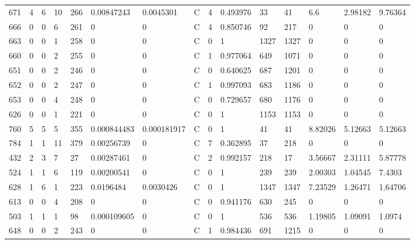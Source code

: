 \begin{latin}
\begin{longtable}{lllllllllllllll}
	671 & 4  & 6   & 10 & 266 & 0.00847243     & 0.0045301      & C & 4  & 0.493976 & 33   & 41   & 6.6     & 2.98182 & 9.76364 \\
	666 & 0  & 0   & 6  & 261 & 0              & 0              & C & 4  & 0.850746 & 92   & 217  & 0       & 0       & 0       \\
	663 & 0  & 0   & 1  & 258 & 0              & 0              & C & 0  & 1        & 1327 & 1327 & 0       & 0       & 0       \\
	660 & 0  & 0   & 2  & 255 & 0              & 0              & C & 1  & 0.977064 & 649  & 1071 & 0       & 0       & 0       \\
	651 & 0  & 0   & 2  & 246 & 0              & 0              & C & 0  & 0.640625 & 687  & 1201 & 0       & 0       & 0       \\
	652 & 0  & 0   & 2  & 247 & 0              & 0              & C & 1  & 0.997093 & 683  & 1186 & 0       & 0       & 0       \\
	653 & 0  & 0   & 4  & 248 & 0              & 0              & C & 0  & 0.729657 & 680  & 1176 & 0       & 0       & 0       \\
	626 & 0  & 0   & 1  & 221 & 0              & 0              & C & 0  & 1        & 1153 & 1153 & 0       & 0       & 0       \\
	760 & 5  & 5   & 5  & 355 & 0.000844483    & 0.000181917    & C & 0  & 1        & 41   & 41   & 8.82026 & 5.12663 & 5.12663 \\
	784 & 1  & 1   & 11 & 379 & 0.00256739     & 0              & C & 7  & 0.362895 & 37   & 218  & 0       & 0       & 0       \\
	432 & 2  & 3   & 7  & 27  & 0.00287461     & 0              & C & 2  & 0.992157 & 218  & 17   & 3.56667 & 2.31111 & 5.87778 \\
	524 & 1  & 1   & 6  & 119 & 0.00200541     & 0              & C & 0  & 1        & 239  & 239  & 2.00303 & 1.04545 & 7.4303  \\
	628 & 1  & 6   & 1  & 223 & 0.0196484      & 0.0030426      & C & 0  & 1        & 1347 & 1347 & 7.23529 & 1.26471 & 1.64706 \\
	613 & 0  & 0   & 4  & 208 & 0              & 0              & C & 0  & 0.941176 & 630  & 245  & 0       & 0       & 0       \\
	503 & 1  & 1   & 1  & 98  & 0.000109605    & 0              & C & 0  & 1        & 536  & 536  & 1.19805 & 1.09091 & 1.0974  \\
	648 & 0  & 0   & 2  & 243 & 0              & 0              & C & 1  & 0.984436 & 691  & 1215 & 0       & 0       & 0       \\

\end{longtable}
\end{latin}
